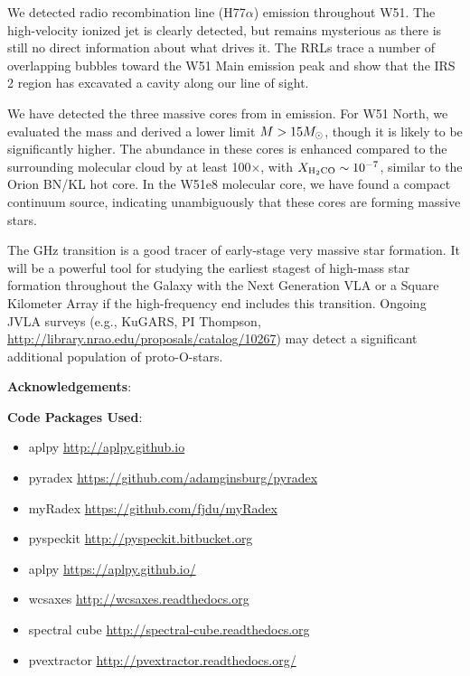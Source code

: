 We detected radio recombination line (H77$\alpha$) emission throughout W51.
The \citet{Lacy2007a} high-velocity ionized jet is clearly detected, but
remains mysterious as there is still no direct information about what drives
it.  The RRLs trace a number of overlapping bubbles toward the W51 Main
emission peak and show that the IRS 2 region has excavated a cavity along our
line of sight.

We have detected the three massive cores from \citet{Zhang1997a} in
\formaldehyde \twotwo emission.  For W51 North, we evaluated the mass and
derived a lower limit $M>15 M_{\odot}$, though it is likely to be significantly
higher.  The \formaldehyde abundance in these cores is enhanced compared to the
surrounding molecular cloud by at least 100$\times$, with $X_{\textrm{H}_2\textrm{CO}}
\sim 10^{-7}$, similar to the Orion BN/KL hot core.  In the W51e8 molecular
core, we have found a compact continuum source, indicating unambiguously that
these cores are forming massive stars.

The \formaldehyde {} GHz transition is a good tracer of early-stage
very massive star formation.  It will be a powerful tool for studying the earliest
stagest of high-mass star formation throughout the Galaxy with the Next Generation VLA
or a Square Kilometer Array if the high-frequency end includes this transition.
Ongoing JVLA surveys (e.g., KuGARS, PI Thompson,
\url{http://library.nrao.edu/proposals/catalog/10267}) may detect a significant
additional population of proto-O-stars.




\textbf{Acknowledgements}:

\textbf{Code Packages Used}:

\begin{itemize}
    \item aplpy \url{http://aplpy.github.io}
    \item pyradex \url{https://github.com/adamginsburg/pyradex}
    \item myRadex \url{https://github.com/fjdu/myRadex}
    \item pyspeckit \url{http://pyspeckit.bitbucket.org}
    \item aplpy \url{https://aplpy.github.io/}
    \item wcsaxes \url{http://wcsaxes.readthedocs.org}
    \item spectral cube \url{http://spectral-cube.readthedocs.org}
    \item pvextractor \url{http://pvextractor.readthedocs.org/}
\end{itemize}

